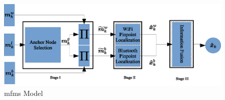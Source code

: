 \documentclass[conference]{IEEEtran}
\begin{document}


\begin{figure}[!pht]
  \centering
  \includegraphics[width=\linewidth]{figures/mfms.eps}
  \caption{\label{fig:mfms-model}\gls{mfms} Model}
\end{figure}
\label{sec:experimentation}






\end{document}
